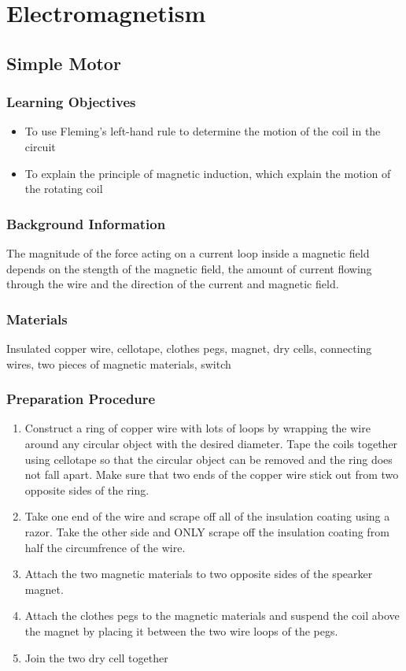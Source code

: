 \section{Electromagnetism}

\subsection{Simple Motor}

\subsubsection*{Learning Objectives}
\begin{itemize}
\item{To use Fleming's left-hand rule to determine the motion of the coil in the circuit} 
\item{To explain the principle of magnetic induction, which explain the motion of the rotating coil} 
\end{itemize}

\subsubsection*{Background Information}
The magnitude of the force acting on a current loop inside a magnetic field depends on the stength of the magnetic field, the amount of current flowing through the wire and the direction of the current and magnetic field.  

\subsubsection*{Materials}
Insulated copper wire, cellotape, clothes pegs, magnet, dry cells, connecting wires, two pieces of magnetic materials, switch

\subsubsection*{Preparation Procedure}
\begin{enumerate}
\item{Construct a ring of copper wire with lots of loops by wrapping the wire around any circular object with the desired diameter. Tape the coils together using cellotape so that the circular object can be removed and the ring does not fall apart. Make sure that two ends of the copper wire stick out from two opposite sides of the ring.} 
\item{ Take one end of the wire and scrape off all of the insulation coating using a razor. Take the other side and ONLY scrape off the insulation coating from half the circumfrence of the wire.} 
\item{Attach the two magnetic materials to two opposite sides of the spearker magnet.} 
\item{Attach the clothes pegs to the magnetic materials and suspend the coil above the magnet by placing it between the two wire loops of the pegs.} 
\item{Join the two dry cell together}
\end{enumerate}

